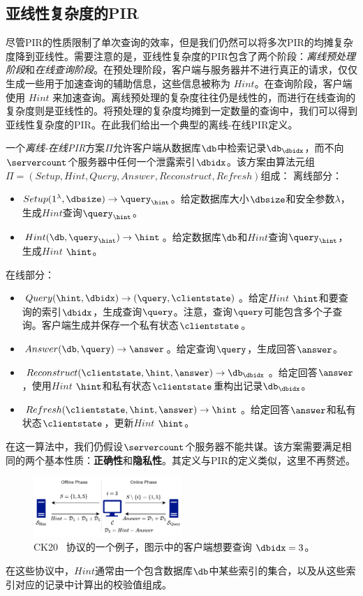 \subsection{亚线性复杂度的PIR}
尽管PIR的性质限制了单次查询的效率，但是我们仍然可以将多次PIR的均摊复杂度降到亚线性。需要注意的是，亚线性复杂度的PIR包含了两个阶段：\textit{离线预处理阶段}和\textit{在线查询阶段}。在预处理阶段，客户端与服务器并不进行真正的请求，仅仅生成一些用于加速查询的辅助信息，这些信息被称为 $Hint$。在查询阶段，客户端使用 $Hint$ 来加速查询。离线预处理的复杂度往往仍是线性的，而进行在线查询的复杂度则是亚线性的。将预处理的复杂度均摊到一定数量的查询中，我们可以得到亚线性复杂度的PIR。在此我们给出一个典型的离线-在线PIR定义。

\begin{definition}[离线-在线PIR]
    一个\textit{离线-在线PIR}方案$\Pi$允许客户端从数据库$\db$中检索记录$\db_\dbidx$，而不向$\servercount$个服务器中任何一个泄露索引$\dbidx$。该方案由算法元组$\Pi = (Setup, Hint, Query, Answer, Reconstruct, Refresh)$组成：
    离线部分：
    \begin{itemize}[leftmargin=*]
        \item $Setup(1^\lambda,\dbsize) \rightarrow \query_\hint$。给定数据库大小$\dbsize$和安全参数$\lambda$，生成$Hint$查询$\query_\hint$。
        \item $Hint(\db, \query_\hint) \rightarrow \hint$。给定数据库$\db$和$Hint$查询$\query_\hint$，生成$Hint$ $\hint$。
    \end{itemize}
    在线部分：
    \begin{itemize}[leftmargin=*]
        \item $Query(\hint, \dbidx) \rightarrow (\query, \clientstate)$。给定$Hint$ $\hint$和要查询的索引$\dbidx$，生成查询$\query$。注意，查询$\query$可能包含多个子查询。客户端生成并保存一个私有状态$\clientstate$。
        \item $Answer(\db, \query) \rightarrow \answer$。给定查询$\query$，生成回答$\answer$。
        \item $Reconstruct(\clientstate, \hint, \answer) \rightarrow \db_\dbidx$。给定回答$\answer$，使用$Hint$ $\hint$和私有状态$\clientstate$重构出记录$\db_\dbidx$。
        \item $Refresh(\clientstate, \hint, \answer) \rightarrow \hint$。给定回答$\answer$和私有状态$\clientstate$，更新$Hint$ $\hint$。
    \end{itemize}
    在这一算法中，我们仍假设$\servercount$个服务器不能共谋。该方案需要满足相同的两个基本性质：\textbf{正确性}和\textbf{隐私性}。其定义与PIR的定义类似，这里不再赘述。
\end{definition}

\begin{figure}
    \centering
    \includegraphics[width=0.5\textwidth]{figure/ck20.png}
    \caption{CK20~\cite{EC:CorKog20} 协议的一个例子，图示中的客户端想要查询 $\dbidx=3$。}
    \label{fig:CK20}
\end{figure}

在这些协议中，$Hint$通常由一个包含数据库$\db$中某些索引的集合，以及从这些索引对应的记录中计算出的校验值组成。